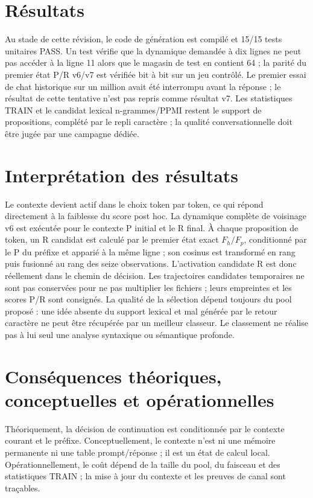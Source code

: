 \documentclass[11pt,a4paper]{report}
\begin{document}
\section{Résultats}
Au stade de cette révision, le code de génération est compilé et 15/15 tests unitaires PASS. Un test vérifie que la dynamique demandée à dix lignes ne peut pas accéder à la ligne 11 alors que le magasin de test en contient 64 ; la parité du premier état P/R v6/v7 est vérifiée bit à bit sur un jeu contrôlé. Le premier essai de chat historique sur un million avait été interrompu avant la réponse ; le résultat de cette tentative n'est pas repris comme résultat v7. Les statistiques TRAIN et le candidat lexical n-grammes/PPMI restent le support de propositions, complété par le repli caractère ; la qualité conversationnelle doit être jugée par une campagne dédiée.
\section{Interprétation des résultats}
Le contexte devient actif dans le choix token par token, ce qui répond directement à la faiblesse du score post hoc. La dynamique complète de voisinage v6 est exécutée pour le contexte P initial et le R final. À chaque proposition de token, un R candidat est calculé par le premier état exact $F_h/F_p$, conditionné par le P du préfixe et apparié à la même ligne ; son cosinus est transformé en rang puis fusionné au rang des seize observations. L'activation candidate R est donc réellement dans le chemin de décision. Les trajectoires candidates temporaires ne sont pas conservées pour ne pas multiplier les fichiers ; leurs empreintes et les scores P/R sont consignés. La qualité de la sélection dépend toujours du pool proposé : une idée absente du support lexical et mal générée par le retour caractère ne peut être récupérée par un meilleur classeur. Le classement ne réalise pas à lui seul une analyse syntaxique ou sémantique profonde.
\section{Conséquences théoriques, conceptuelles et opérationnelles}
Théoriquement, la décision de continuation est conditionnée par le contexte courant et le préfixe. Conceptuellement, le contexte n'est ni une mémoire permanente ni une table prompt/réponse ; il est un état de calcul local. Opérationnellement, le coût dépend de la taille du pool, du faisceau et des statistiques TRAIN ; la mise à jour du contexte et les preuves de canal sont traçables.
\end{document}
